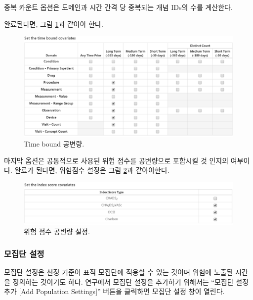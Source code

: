 \documentclass[11pt]{book}
\theoremstyle{definition}
\theoremstyle{definition}
\theoremstyle{definition}
\theoremstyle{remark}
\begin{document}
중복 카운트 옵션은 도메인과 시간 간격 당 중복되는 개념 IDs의 수를
계산한다.

완료된다면, 그림 \ref{fig:covariateSettings5}과 같아야 한다.

\begin{figure}

{\centering \includegraphics[width=1\linewidth]{images/PatientLevelPrediction/covariateSettings5} 

}

\caption{Time bound 공변량.}\label{fig:covariateSettings5}
\end{figure}

마지막 옵션은 공통적으로 사용된 위험 점수를 공변량으로 포함시킬 것
인지의 여부이다. 완료가 된다면, 위험점수 설정은 그림
\ref{fig:covariateSettings6}과 같아야한다.

\begin{figure}

{\centering \includegraphics[width=1\linewidth]{images/PatientLevelPrediction/covariateSettings6} 

}

\caption{위험 점수 공변량 설정.}\label{fig:covariateSettings6}
\end{figure}

\subsubsection*{모집단 설정}\label{-}

모집단 설정은 선정 기준이 표적 모집단에 적용할 수 있는 것이며 위험에
노출된 시간을 정의하는 것이기도 하다. 연구에서 모집단 설정을 추가하기
위해서는 ``모집단 설정 추가 {[}Add Population Settings{]}'' 버튼을
클릭하면 모집단 설정 창이 열린다.
\end{document}
